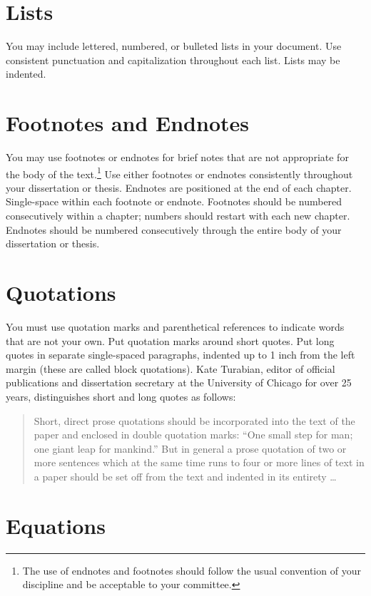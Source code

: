 \section{Lists}

You may include lettered, numbered, or bulleted lists in your document.
Use consistent punctuation and capitalization throughout each list.
Lists may be indented.

\section{Footnotes and Endnotes}

You may use footnotes or endnotes for brief notes that are not appropriate for the body of the text.\footnote{The use of endnotes and footnotes should follow the usual convention of your discipline and be acceptable to your committee.}
Use either footnotes or endnotes consistently throughout your dissertation or thesis.
Endnotes are positioned at the end of each chapter.
Single-space within each footnote or endnote.
Footnotes should be numbered consecutively within a chapter; numbers should restart with each new chapter.
Endnotes should be numbered consecutively through the entire body of your dissertation or thesis.

\section{Quotations}

You must use quotation marks and parenthetical references to indicate words that are not your own.
Put quotation marks around short quotes.
Put long quotes in separate single-spaced paragraphs, indented up to 1 inch from the left margin (these are called block quotations).
Kate Turabian, editor of official publications and dissertation secretary at the University of Chicago for over 25 years, distinguishes short and long quotes as follows:

\begin{quote}
    Short, direct prose quotations should be incorporated into the text of the paper and enclosed in
    double quotation marks: ``One small step for man; one giant leap for mankind.'' But in general a
    prose quotation of two or more sentences which at the same time runs to four or more lines of
    text in a paper should be set off from the text and indented in its
    entirety \ldots\ \cite{Turabian}
\end{quote}

\section{Equations}

